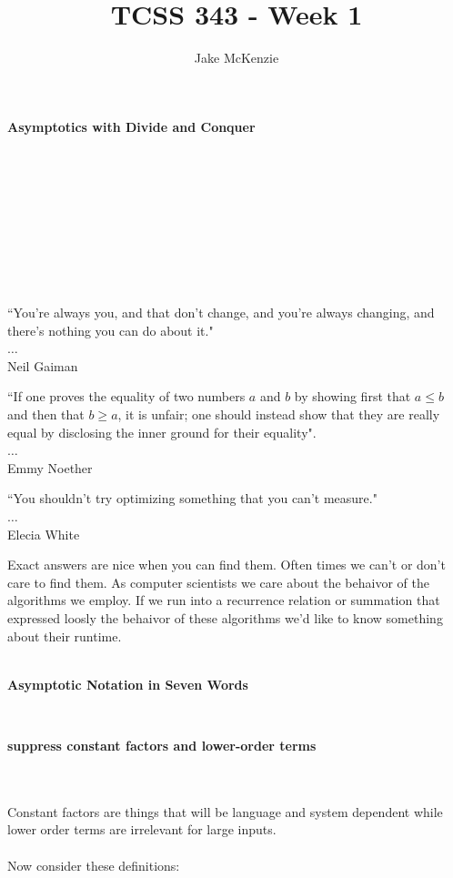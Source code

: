 \documentclass[12pt]{article}
\begin{document}
\title{TCSS 343 - Week 1}
\author{Jake McKenzie}
\maketitle
\noindent\centerline{\textbf{Asymptotics with Divide and Conquer}}\\\\\\\\\\\\\\\\
\begin{center}
    ``You're always you, and that don't change, and you're always changing, and there's nothing you can do about it." \\$\dots$\\ Neil Gaiman
\end{center}
\begin{center}
    ``If one proves the equality of two numbers $a$ and $b$ by showing first that $a \leq b$ and then that $b \geq a$, it is unfair; one should instead show that they are really equal by disclosing the inner ground for their equality". \\$\dots$\\Emmy Noether
\end{center}
\begin{center}
    ``You shouldn't try optimizing something that you can't measure." \\$\dots$\\ Elecia White
\end{center}
    \newpage
Exact answers are nice when you can find them. Often times we can't or don't care to find them. As computer scientists we care about the behaivor of the algorithms we employ. If we run into a recurrence relation or summation that expressed loosly the behaivor of these algorithms we'd like to know something about their runtime.\\\\
\centerline{\textbf{Asymptotic Notation in Seven Words}}\\
\centerline{\textbf{suppress constant factors and lower-order terms}}\\\\
Constant factors are things that will be language and system dependent while lower order terms are irrelevant for large inputs.\\\\
Now consider these definitions:\\
\end{document}
